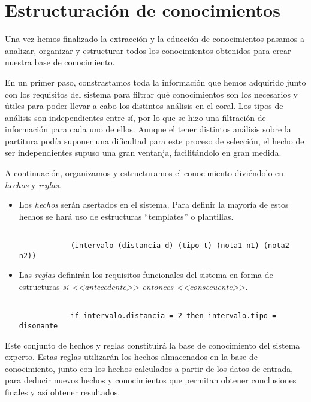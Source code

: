 \section{Estructuración de conocimientos} 

Una vez hemos finalizado la extracción y la educción de conocimientos pasamos a analizar, organizar y estructurar todos los conocimientos obtenidos para crear nuestra base de conocimiento.

En un primer paso, constrastamos toda la información que hemos adquirido junto con los requisitos del sistema para filtrar qué conocimientos son los necesarios y útiles para poder llevar a cabo los distintos análisis en el coral. Los tipos de análisis son independientes entre sí, por lo que se hizo una filtración de información para cada uno de ellos. Aunque el tener distintos análisis sobre la partitura podía suponer una dificultad para este proceso de selección, el hecho de ser independientes supuso una gran ventanja, facilitándolo en gran medida. 

A continuación, organizamos y estructuramos el conocimiento diviéndolo en \textit{hechos} y \textit{reglas}. 

\begin{itemize}

	\item Los \textit{hechos} serán asertados en el sistema. Para definir la mayoría de estos hechos se hará uso de estructuras ``templates'' o plantillas.

	\bigskip

		\begin{lstlisting}

			(intervalo (distancia d) (tipo t) (nota1 n1) (nota2 n2))

		\end{lstlisting}

	\bigskip

	\item Las \textit{reglas} definirán los requisitos funcionales del sistema en forma de estructuras \textit{si <<antecedente>> entonces <<consecuente>>}. 

	\bigskip

		\begin{lstlisting}

			if intervalo.distancia = 2 then intervalo.tipo = disonante

		\end{lstlisting}

	\bigskip

\end{itemize} 

Este conjunto de hechos y reglas constituirá la base de conocimiento del sistema experto. Estas reglas utilizarán los hechos almacenados en la base de conocimiento, junto con los hechos calculados a partir de los datos de entrada, para deducir nuevos hechos y conocimientos que permitan obtener conclusiones finales y así obtener resultados.